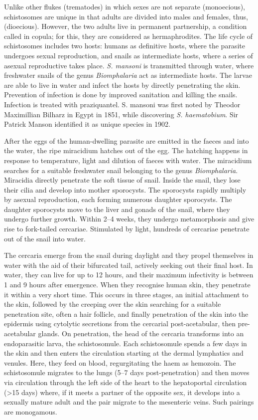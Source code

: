 Unlike other flukes (trematodes) in which sexes are not separate
(monoecious), schistosomes are unique in that adults are divided into
males and females, thus, (dioecious). However, the two adults live in
permanent partnership, a condition called in copula; for this, they are
considered as hermaphrodites. The life cycle of schistosomes includes
two hosts: humans as definitive hosts, where the parasite undergoes
sexual reproduction, and snails as intermediate hosts, where a series of
asexual reproductive takes place. \emph{S. mansoni} is transmitted through
water, where freshwater snails of the genus \emph{Biomphalaria} act as
intermediate hosts. The larvae are able to live in water and infect the
hosts by directly penetrating the skin. Prevention of infection is done
by improved sanitation and killing the snails. Infection is treated with
praziquantel. S. mansoni was first noted by Theodor Maximillian Bilharz
in Egypt in 1851, while discovering \emph{S. haematobium}. Sir Patrick Manson
identified it as unique species in 1902.

After the eggs of the human-dwelling parasite are emitted in the faeces
and into the water, the ripe miracidium hatches out of the egg. The
hatching happens in response to temperature, light and dilution of
faeces with water. The miracidium searches for a suitable freshwater
snail belonging to the genus \emph{Biomphalaria}. Miracidia directly penetrate
the soft tissue of snail. Inside the snail, they lose their cilia and
develop into mother sporocysts. The sporocysts rapidly multiply by
asexual reproduction, each forming numerous daughter sporocysts. The
daughter sporocysts move to the liver and gonads of the snail, where
they undergo further growth. Within 2--4 weeks, they undergo
metamorphosis and give rise to fork-tailed cercariae. Stimulated by
light, hundreds of cercariae penetrate out of the snail into water.

The cercaria emerge from the snail during daylight and they propel
themselves in water with the aid of their bifurcated tail, actively
seeking out their final host. In water, they can live for up to 12
hours, and their maximum infectivity is between 1 and 9 hours after
emergence. When they recognise human skin, they penetrate it within a
very short time. This occurs in three stages, an initial attachment to
the skin, followed by the creeping over the skin searching for a
suitable penetration site, often a hair follicle, and finally
penetration of the skin into the epidermis using cytolytic secretions
from the cercarial post-acetabular, then pre-acetabular glands. On
penetration, the head of the cercaria transforms into an endoparasitic
larva, the schistosomule. Each schistosomule spends a few days in the
skin and then enters the circulation starting at the dermal lymphatics
and venules. Here, they feed on blood, regurgitating the haem as
hemozoin. The schistosomule migrates to the lungs (5--7 days
post-penetration) and then moves via circulation through the left side
of the heart to the hepatoportal circulation (\textgreater{}15 days)
where, if it meets a partner of the opposite sex, it develops into a
sexually mature adult and the pair migrate to the mesenteric veins. Such
pairings are monogamous.

